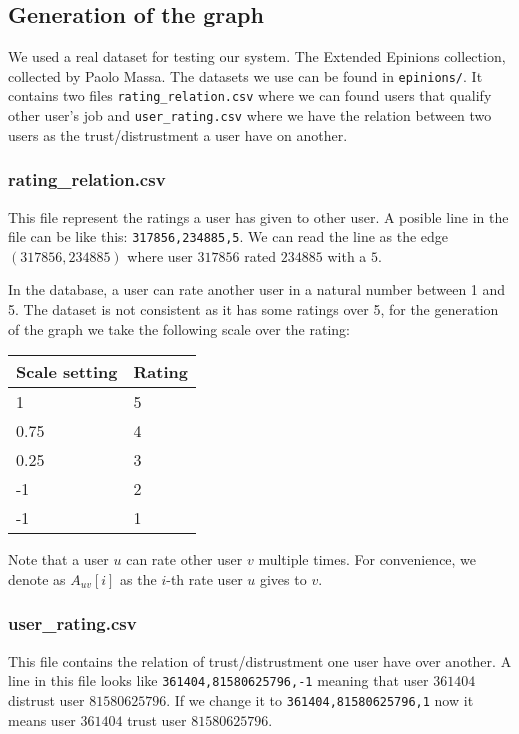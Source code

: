 \documentclass[letter,10pt]{article}
\theoremstyle{definition}
\begin{document}
\subsection{Generation of the graph}
We used a real dataset for testing our system. The Extended Epinions collection, collected by Paolo Massa. The datasets we use can be found in \texttt{epinions/}. It contains two files \texttt{rating\_relation.csv} where we can found users that qualify other user's job and \texttt{user\_rating.csv} where we have the relation between two users as the trust/distrustment a user have on another. 

\subsubsection{rating\_relation.csv}
This file represent the ratings a user has given to other user. A posible line in the file can be like this: \texttt{317856,234885,5}. We can read the line as the edge $(317856,234885)$ where user $317856$ rated $234885$ with a $5$.

In the database, a user can rate another user in a natural number between 1 and 5. The dataset is not consistent as it has some ratings over 5, for the generation of the graph we take the following scale over the rating:

\begin{center}
    \begin{tabular} { | m{5em} | m{1cm}|} 
      \hline
       Scale setting & Rating \\ 
      \hline
       1 & 5 \\ 
       0.75 & 4 \\ 
       0.25 & 3 \\ 
       -1 & 2 \\ 
       -1 & 1 \\ 
      \hline
    \end{tabular}
\end{center}

Note that a user $u$ can rate other user $v$ multiple times. For convenience, we denote as $A_{uv}[i]$ as the $i$-th rate user $u$ gives to $v$.

\subsubsection{user\_rating.csv}

This file contains the relation of trust/distrustment one user have over another. A line in this file looks like \texttt{361404,81580625796,-1} meaning that user $361404$ distrust user $81580625796$. If we change it to \texttt{361404,81580625796,1} now it means user $361404$ trust user $81580625796$.
\end{document}
